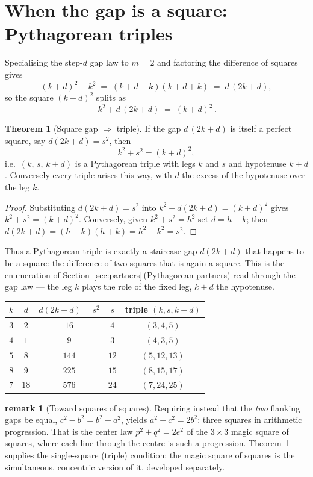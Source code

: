 \documentclass[11pt]{article}
\theoremstyle{definition}
\newtheorem{theorem}{Theorem}
\newtheorem{remark}{remark}
\begin{document}
\section{When the gap is a square: Pythagorean triples}

Specialising the step-$d$ gap law to $m=2$ and factoring the difference of
squares gives
\[
  (k+d)^{2}-k^{2} \;=\; (k+d-k)(k+d+k) \;=\; d\,(2k+d),
\]
so the square $(k+d)^{2}$ splits as
\[
  \boxed{\,k^{2} + d\,(2k+d) \;=\; (k+d)^{2}\,}.
\]

\begin{theorem}[Square gap $\Rightarrow$ triple]\label{thm:squaregap}
If the gap $d\,(2k+d)$ is itself a perfect square, say $d(2k+d)=s^{2}$, then
\[
  k^{2} + s^{2} = (k+d)^{2},
\]
i.e.\ $(k,\,s,\,k+d)$ is a Pythagorean triple with legs $k$ and $s$ and
hypotenuse $k+d$. Conversely every triple arises this way, with $d$ the
excess of the hypotenuse over the leg $k$.
\end{theorem}

\begin{proof}
Substituting $d(2k+d)=s^{2}$ into $k^{2}+d(2k+d)=(k+d)^{2}$ gives
$k^{2}+s^{2}=(k+d)^{2}$. Conversely, given $k^{2}+s^{2}=h^{2}$ set $d=h-k$;
then $d(2k+d)=(h-k)(h+k)=h^{2}-k^{2}=s^{2}$.
\end{proof}

\noindent Thus a Pythagorean triple is exactly a staircase gap $d(2k+d)$ that
happens to be a square: the difference of two squares that is again a square.
This is the enumeration of Section~\ref{sec:partners}\,(Pythagorean partners)
read through the gap law --- the leg $k$ plays the role of the fixed leg, $k+d$
the hypotenuse.

\begin{center}
\begin{tabular}{c c c c c}
\hline
$k$ & $d$ & $d(2k+d)=s^{2}$ & $s$ & triple $(k,s,k+d)$\\
\hline
$3$  & $2$  & $16$  & $4$  & $(3,4,5)$\\
$4$  & $1$  & $9$   & $3$  & $(4,3,5)$\\
$5$  & $8$  & $144$ & $12$ & $(5,12,13)$\\
$8$  & $9$  & $225$ & $15$ & $(8,15,17)$\\
$7$  & $18$ & $576$ & $24$ & $(7,24,25)$\\
\hline
\end{tabular}
\end{center}

\begin{remark}[Toward squares of squares]
Requiring instead that the \emph{two} flanking gaps be equal,
$c^{2}-b^{2}=b^{2}-a^{2}$, yields $a^{2}+c^{2}=2b^{2}$: three squares in
arithmetic progression. That is the center law $p^{2}+q^{2}=2e^{2}$ of the
$3\times3$ magic square of squares, where each line through the centre is such a
progression. Theorem~\ref{thm:squaregap} supplies the single-square (triple)
condition; the magic square of squares is the simultaneous, concentric version
of it, developed separately.
\end{remark}
\end{document}

